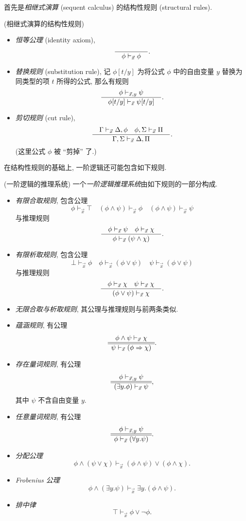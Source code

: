 首先是\emph{相继式演算} (sequent calculus) 的结构性规则 (structural rules).

\begin{definition}
	{(相继式演算的结构性规则)}
	\begin{itemize}
		\item \emph{恒等公理} (identity axiom),
		$$
		\frac{\quad  \quad}{\quad \phi\vdash_{\vec x} \phi \quad}.
		$$
		\item \emph{替换规则} (substitution rule),
		记 $\phi[t/y]$ 为将公式 $\phi$ 中的自由变量 $y$ 替换为同类型的项 $t$ 所得的公式, 那么有规则
		$$
		\frac{\quad \phi \vdash_{\vec x,y} \psi \quad}{\quad \phi[t/y]\vdash_{\vec x}\psi[t/y] \quad}.
		$$
		\item \emph{剪切规则} (cut rule),
		$$
		\frac{\quad 
			\Gamma \vdash_{\vec x} \Delta , \phi
			\quad
			\phi, \Sigma \vdash_{\vec x} \Pi 
		 \quad}{\quad 
			\Gamma,\Sigma \vdash_{\vec x} \Delta,\Pi
		 \quad}.
		$$
		(这里公式 $\phi$ 被 ``剪掉'' 了.)
	\end{itemize}
\end{definition}

在结构性规则的基础上, 一阶逻辑还可能包含如下规则.

\begin{definition}
	{(一阶逻辑的推理系统)}
	一个\emph{一阶逻辑推理系统}由如下规则的一部分构成.
	\begin{itemize}
		\item \emph{有限合取规则}, 包含公理
		$$
		\phi \vdash_{\vec x} \top
		\quad
		(\phi\wedge\psi)\vdash_{\vec x} \phi
		\quad
		(\phi\wedge\psi)\vdash_{\vec x} \psi
		$$
		与推理规则
		$$
		\frac{\quad \phi\vdash_{\vec x} \psi\quad \phi\vdash_{\vec x} \chi \quad}{\quad \phi\vdash_{\vec x} (\psi\wedge\chi) \quad}.
		$$
		\item \emph{有限析取规则}, 包含公理
		$$
		\bot \vdash_{\vec x} \phi
		\quad
		\phi \vdash_{\vec x} (\phi\vee\psi)
		\quad
		\psi \vdash_{\vec x} (\phi\vee\psi)
		$$
		与推理规则
		$$
		\frac{\quad \phi \vdash_{\vec x} \chi \quad \psi \vdash_{\vec x} \chi \quad}{\quad  (\phi\vee\psi)\vdash_{\vec x}\chi \quad}.
		$$
		\item \emph{无限合取与析取规则}, 其公理与推理规则与前两条类似.
		\item \emph{蕴涵规则}, 有公理
		$$
		\begin{array} {c} \phi\wedge\psi \vdash_{\vec x} \chi \\ \hline \hline \psi\vdash_{\vec x} (\phi\Rightarrow\chi) \end{array}.
		$$
		\item \emph{存在量词规则}, 有公理
		$$
		\begin{array} {c} \phi \vdash_{\vec x,y} \psi \\ \hline \hline (\exists y.\phi)\vdash_{\vec x} \psi \end{array},
		$$
		其中 $\psi$ 不含自由变量 $y$.
		\item \emph{任意量词规则}, 有公理
		$$
		\begin{array} {c} \phi \vdash_{\vec x,y} \psi \\ \hline \hline \phi\vdash_{\vec x} (\forall y.\psi) \end{array}.
		$$
		\item \emph{分配公理}
		$$
		\phi\wedge(\psi\vee\chi)\vdash_{\vec{x}}(\phi\wedge\psi)\vee(\phi\wedge\chi).
		$$
		\item \emph{Frobenius 公理}
		$$
		\phi\land(\exists y.\psi)\vdash_{\vec{x}}\exists y.(\phi\land\psi).
		$$
		\item \emph{排中律}
		$$
		\top\vdash_{\vec{x}}\phi\lor\neg\phi.
		$$
	\end{itemize}
\end{definition}

